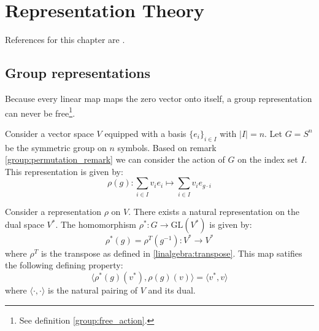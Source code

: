 \chapter{Representation Theory}

References for this chapter are \cite{fultonharris, jeevanjee}.

\section{Group representations}
    	
    	\begin{property}
    		Because every linear map maps the zero vector onto itself, a group representation can never be free\footnote{See definition \ref{group:free_action}.}.
    	\end{property}

        
	\begin{example}
		Consider a vector space $V$ equipped with a basis $\{e_i\}_{i\in I}$ with $|I| = n$. Let $G = S^n$ be the symmetric group on $n$ symbols. Based on remark \ref{group:permutation_remark} we can consider the action of $G$ on the index set $I$. This representation is given by:
		\begin{equation}
			\rho(g):\sum_{i\in I}v_ie_i\mapsto\sum_{i\in I}v_ie_{g\cdot i}
		\end{equation}
	\end{example}
        
        \begin{example}
        	Consider a representation $\rho$ on $V$. There exists a natural representation on the dual space $V^*$. The homomorphism $\rho^*:G\rightarrow\text{GL}(V^*)$ is given by:
            \begin{equation}
            	\rho^*(g) = \rho^T(g^{-1}): V^*\rightarrow V^*
            \end{equation}
            where $\rho^T$ is the transpose as defined in \ref{linalgebra:transpose}. This map satifies the following defining property:
            \begin{equation}
            	\Big\langle\rho^*(g)(v^*), \rho(g)(v)\Big\rangle = \langle v^*, v\rangle
            \end{equation}
            where $\langle\cdot,\cdot\rangle$ is the natural pairing of $V$ and its dual.
        \end{example}
        
